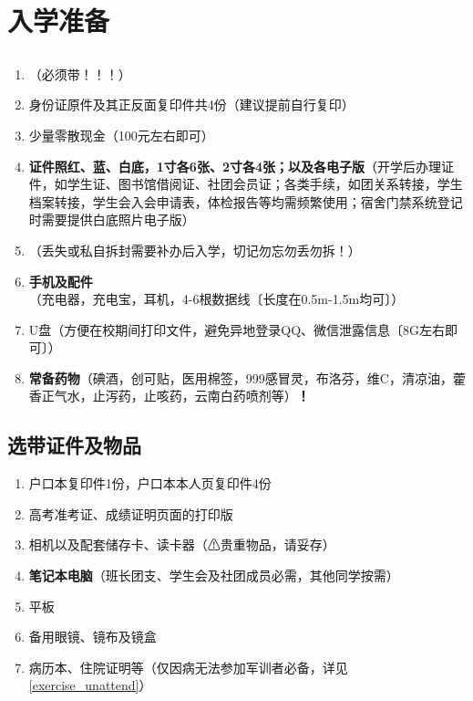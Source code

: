 \chapter[入学准备]{入学准备}

\section[必要证件及物品]{}
\begin{enumerate}
      \item \textbf{}（必须带！！！）
      \item 身份证原件及其正反面复印件共4份（建议提前自行复印）
      \item 少量零散现金（100元左右即可）\footnotemark
      \item \textbf{证件照红、蓝、白底，1寸各6张、2寸各4张；以及各电子版}（开学后办理证件，如学生证、图书馆借阅证、社团会员证；各类手续，如团关系转接，学生档案转接，学生会入会申请表，体检报告等均需频繁使用；宿舍门禁系统登记时需要提供白底照片电子版）
      \item \textbf{}（丢失或私自拆封需要补办后入学，切记勿忘勿丢勿拆！）
      \item \textbf{手机及配件}（充电器，充电宝，耳机，4-6根数据线〔长度在0.5m-1.5m均可〕）
      \item U盘（方便在校期间打印文件，避免异地登录QQ、微信泄露信息〔8G左右即可〕）
      \item \textbf{常备药物}（碘酒，创可贴，医用棉签，999感冒灵，布洛芬，维C，清凉油，藿香正气水，止泻药，止咳药，云南白药喷剂等）\textbf{！}
\end{enumerate}

\section[选带证件及物品]{选带证件及物品}
\begin{enumerate}
      \item 户口本复印件1份，户口本本人页复印件4份\footnotemark
      \item 高考准考证、成绩证明页面的打印版\footnotemark
      \item 相机以及配套储存卡、读卡器（⚠贵重物品，请妥存）
      \item \textbf{笔记本电脑}（班长团支、学生会及社团成员必需，其他同学按需）
      \item 平板\footnotemark
      \item 备用眼镜、镜布及镜盒
      \item 病历本、住院证明等（仅因病无法参加军训者必备，详见\uline{\ref{exercise_unattend}}）
\end{enumerate}

